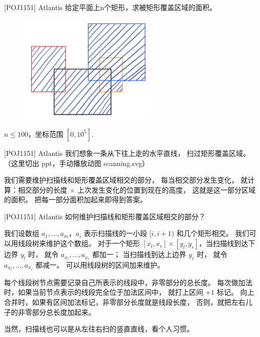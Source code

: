 \documentclass{beamer}
\begin{document}
\begin{frame}{[POJ1151] Atlantis}
    \small
    给定平面上n个矩形，求被矩形覆盖区域的面积。
    \begin{figure}[H]
        \centering
        \includegraphics[width=0.6\textwidth]{pic/atlantis.jpg}
    \end{figure}
    $n\leq 100$，坐标范围 $[0,10^5]$.
\end{frame}

\begin{frame}{[POJ1151] Atlantis}
    \small
    我们想象一条从下往上走的水平直线，
    扫过矩形覆盖区域。
    （这里切出 ppt，手动播放动图 scanning.svg）

    \vspace{1em}\pause
    我们需要维护扫描线和矩形覆盖区域相交的部分，
    每当相交部分发生变化，
    就计算：相交部分的长度 $\times$ 上次发生变化的位置到现在的高度，
    这就是这一部分区域的面积。
    把每一部分面积加起来即得到答案。
\end{frame}

\begin{frame}{[POJ1151] Atlantis}
    \footnotesize
    如何维护扫描线和矩形覆盖区域相交的部分？
    
    \vspace{1em}\pause
    我们设数组 $a_1,...,a_m$，$a_i$ 表示扫描线的一小段 $[i,i+1)$ 和几个矩形相交。
    我们可以用线段树来维护这个数组。
    对于一个矩形 $[x_l,x_r]\times[y_l,y_r]$，当扫描线到达下边界 $y_l$ 时，
    就令 $a_{x_l},...,a_{x_r}$ 都加一；
    当扫描线到达上边界 $y_r$ 时，
    就令 $a_{x_l},...,a_{x_r}$ 都减一。
    可以用线段树的区间加来维护。

    \vspace{1em}\pause
    每个线段树节点需要记录自己所表示的线段中，非零部分的总长度。
    每次做加法时，如果当前节点表示的线段完全位于加法区间中，
    就打上区间 $+1$ 标记。
    向上合并时，如果有区间加法标记，非零部分长度就是线段长度，
    否则，就把左右儿子的非零部分总长度加起来。

    \vspace{1em}
    当然，扫描线也可以是从左往右扫的竖直直线，看个人习惯。
\end{frame}
\end{document}
